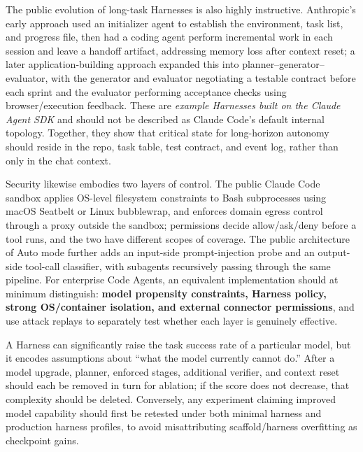 \documentclass[10pt,a4paper,UTF8,fontset=none]{ctexart}
\begin{document}
The public evolution of long-task Harnesses is also highly instructive. Anthropic's early approach used an initializer agent to establish the environment, task list, and progress file, then had a coding agent perform incremental work in each session and leave a handoff artifact, addressing memory loss after context reset\cite{anthropic2025longharness}; a later application-building approach expanded this into planner--generator--evaluator, with the generator and evaluator negotiating a testable contract before each sprint and the evaluator performing acceptance checks using browser/execution feedback\cite{anthropic2026harnessdesign}. These are \emph{example Harnesses built on the Claude Agent SDK} and should not be described as Claude Code's default internal topology. Together, they show that critical state for long-horizon autonomy should reside in the repo, task table, test contract, and event log, rather than only in the chat context.

Security likewise embodies two layers of control. The public Claude Code sandbox applies OS-level filesystem constraints to Bash subprocesses using macOS Seatbelt or Linux bubblewrap, and enforces domain egress control through a proxy outside the sandbox; permissions decide allow/ask/deny before a tool runs, and the two have different scopes of coverage\cite{claudecodesandbox2026}. The public architecture of Auto mode further adds an input-side prompt-injection probe and an output-side tool-call classifier, with subagents recursively passing through the same pipeline\cite{anthropic2026automode}. For enterprise Code Agents, an equivalent implementation should at minimum distinguish: \textbf{model propensity constraints, Harness policy, strong OS/container isolation, and external connector permissions}, and use attack replays to separately test whether each layer is genuinely effective.

\begin{keybox}
A Harness can significantly raise the task success rate of a particular model, but it encodes assumptions about ``what the model currently cannot do.'' After a model upgrade, planner, enforced stages, additional verifier, and context reset should each be removed in turn for ablation; if the score does not decrease, that complexity should be deleted. Conversely, any experiment claiming improved model capability should first be retested under both minimal harness and production harness profiles, to avoid misattributing scaffold/harness overfitting as checkpoint gains.
\end{keybox}
\end{document}
